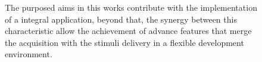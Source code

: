 \begin{figure}[H]
\begin{centering}

\par\end{centering}
\caption[Thesis contribution]{The purposed aims in this works contribute with the implementation of a integral application, beyond that, the synergy between this characteristic allow the achievement of advance features that merge the acquisition with the stimuli delivery in a flexible development environment.}
\label{fig:outline}
\end{figure}